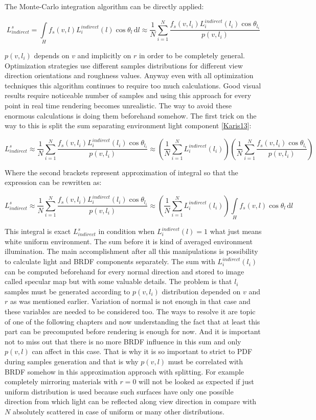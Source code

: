 The Monte-\/\+Carlo integration algorithm can be directly applied\+:

\[L_{indirect}^s = \int\limits_H f_s(v, l)L_i^{indirect}(l)\cos\theta_l\, \mathrm{d}l \approx \frac{1}{N}\sum_{i=1}^N \frac{f_s(v, l_i) L_i^{indirect}(l_i) \cos\theta_{l_i}}{p(v, l_i)}\]

$p(v, l_i)$ depends on $v$ and implicitly on $r$ in order to be completely general. Optimization strategies use different samples distributions for different view direction orientations and roughness values. Anyway even with all optimization techniques this algorithm continues to require too much calculations. Good visual results require noticeable number of samples and using this approach for every point in real time rendering becomes unrealistic. The way to avoid these enormous calculations is doing them beforehand somehow. The first trick on the way to this is split the sum separating environment light component \mbox{[}\hyperlink{specification__pbr_math_Karis13}{Karis13}\mbox{]}\+:

\[L_{indirect}^s \approx \frac{1}{N} \sum_{i=1}^N \frac{f_s(v, l_i) L_i^{indirect}(l_i) \cos\theta_{l_i}}{p(v, l_i)} \approx \left( \frac{1}{N} \sum_{i=1}^N L_i^{indirect}(l_i) \right) \left( \frac{1}{N} \sum_{i=1}^N \frac{f_s(v, l_i) \cos\theta_{l_i}}{p(v, l_i)} \right)\]

Where the second brackets represent approximation of integral so that the expression can be rewritten as\+:

\[L_{indirect}^s \approx \frac{1}{N} \sum_{i=1}^N \frac{f_s(v, l_i) L_i^{indirect}(l_i) \cos\theta_{l_i}}{p(v, l_i)} \approx \left( \frac{1}{N} \sum_{i=1}^N L_i^{indirect}(l_i) \right) \int\limits_H f_s(v, l) \cos\theta_l\, \mathrm{d}l\]

This integral is exact $L_{indirect}^s$ in condition when $L_i^{indirect}(l) = 1$ what just means white uniform environment. The sum before it is kind of averaged environment illumination. The main accomplishment after all this manipulations is possibility to calculate light and B\+R\+DF components separately. The sum with $L_i^{indirect}(l_i)$ can be computed beforehand for every normal direction and stored to image called specular map but with some valuable details. The problem is that $l_i$ samples must be generated according to $p(v, l_i)$ distribution depended on $v$ and $r$ as was mentioned earlier. Variation of normal is not enough in that case and these variables are needed to be considered too. The ways to resolve it are topic of one of the following chapters and now understanding the fact that at least this part can be precomputed before rendering is enough for now. And it is important not to miss out that there is no more B\+R\+DF influence in this sum and only $p(v, l)$ can affect in this case. That is why it is so important to strict to P\+DF during samples generation and that is why $p(v, l)$ must be correlated with B\+R\+DF somehow in this approximation approach with splitting. For example completely mirroring materials with $r = 0$ will not be looked as expected if just uniform distribution is used because such surfaces have only one possible direction from which light can be reflected along view direction in compare with $N$ absolutely scattered in case of uniform or many other distributions.

